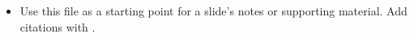 
\begin{itemize}
    \item Use this file as a starting point for a slide's notes or supporting
          material. Add citations with .
\end{itemize}
